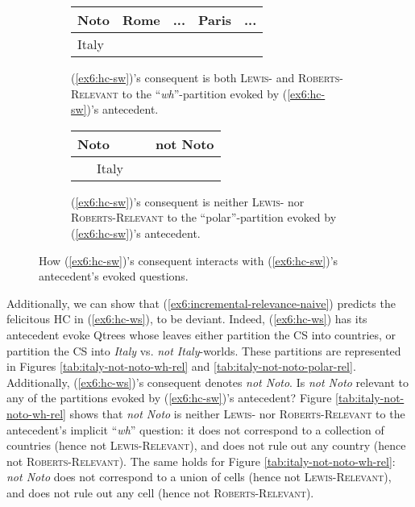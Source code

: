 \begin{figure}[H]
	\centering
	\begin{subfigure}[t]{.47\linewidth}
		\centering
		\begin{tabular}{|lll|ll}
			\hline
			\multicolumn{1}{|l|}{Noto} & \multicolumn{1}{l|}{Rome} & ... & \multicolumn{1}{l|}{Paris} & \multicolumn{1}{l|}{...} \\ \hline
			\multicolumn{3}{|l|}{\cellcolor{blue!20!white}Italy}                             & \multicolumn{2}{l}{}                                  \\ \cline{1-3}
		\end{tabular}
		\caption{(\ref{ex6:hc-sw})'s consequent is both \textsc{Lewis-} and \textsc{Roberts-Relevant} to the ``\textit{wh}''-partition evoked by (\ref{ex6:hc-sw})'s antecedent.}\label{tab:not-noto-italy-wh-rel}
	\end{subfigure}
	\hfill
	\begin{subfigure}[t]{.47\linewidth}
		\centering
		\begin{tabular}{|lllll}
			\hline
			\multicolumn{1}{|l|}{Noto} & \multicolumn{4}{l|}{not Noto} \\ \hline
			\multicolumn{3}{|l|}{\cellcolor{blue!20!white}~~~Italy~~~}                &       &       \\ \cline{1-3}
		\end{tabular}
		\caption{(\ref{ex6:hc-sw})'s consequent is neither \textsc{Lewis-} nor \textsc{Roberts-Relevant} to the ``polar''-partition evoked by (\ref{ex6:hc-sw})'s antecedent.}\label{tab:not-noto-italy-polar-rel}
	\end{subfigure}
	\caption{How (\ref{ex6:hc-sw})'s consequent interacts with (\ref{ex6:hc-sw})'s antecedent's evoked questions.}
\end{figure}

Additionally, we can show that (\ref{ex6:incremental-relevance-naive}) predicts the felicitous HC in (\ref{ex6:hc-ws}), to be deviant.  Indeed, (\ref{ex6:hc-ws}) has its antecedent evoke Qtrees whose leaves either partition the CS into countries, or partition the CS into \textit{Italy} vs. \textit{not Italy}-worlds. These partitions are represented in Figures \ref{tab:italy-not-noto-wh-rel} and \ref{tab:italy-not-noto-polar-rel}. Additionally, (\ref{ex6:hc-ws})'s consequent denotes \textit{not Noto}. Is \textit{not Noto} relevant to any of the partitions evoked by (\ref{ex6:hc-sw})'s antecedent? Figure \ref{tab:italy-not-noto-wh-rel} shows that \textit{not Noto} is neither \textsc{Lewis-} nor \textsc{Roberts-Relevant} to the antecedent's implicit ``\textit{wh}'' question: it does not correspond to a collection of countries (hence not \textsc{Lewis-Relevant}), and does not rule out any country (hence not \textsc{Roberts-Relevant}). The same holds for Figure \ref{tab:italy-not-noto-wh-rel}: \textit{not Noto} does not correspond to a union of cells (hence not \textsc{Lewis-Relevant}), and does not rule out any cell (hence not \textsc{Roberts-Relevant}). 

